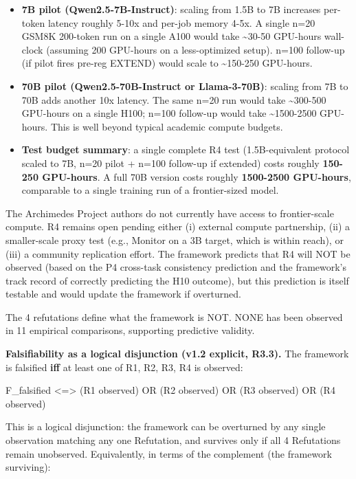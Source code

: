 \documentclass[11pt]{article}
\begin{document}
\begin{itemize}
\item
  \textbf{7B pilot (Qwen2.5-7B-Instruct)}: scaling from 1.5B to 7B
  increases per-token latency roughly 5-10x and per-job memory 4-5x. A
  single n=20 GSM8K 200-token run on a single A100 would take
  \textasciitilde30-50 GPU-hours wall-clock (assuming 200 GPU-hours on a
  less-optimized setup). n=100 follow-up (if pilot fires pre-reg EXTEND)
  would scale to \textasciitilde150-250 GPU-hours.
\item
  \textbf{70B pilot (Qwen2.5-70B-Instruct or Llama-3-70B)}: scaling from
  7B to 70B adds another 10x latency. The same n=20 run would take
  \textasciitilde300-500 GPU-hours on a single H100; n=100 follow-up
  would take \textasciitilde1500-2500 GPU-hours. This is well beyond
  typical academic compute budgets.
\item
  \textbf{Test budget summary}: a single complete R4 test
  (1.5B-equivalent protocol scaled to 7B, n=20 pilot + n=100 follow-up
  if extended) costs roughly \textbf{150-250 GPU-hours}. A full 70B
  version costs roughly \textbf{1500-2500 GPU-hours}, comparable to a
  single training run of a frontier-sized model.
\end{itemize}

The Archimedes Project authors do not currently have access to
frontier-scale compute. R4 remains open pending either (i) external
compute partnership, (ii) a smaller-scale proxy test (e.g., Monitor on a
3B target, which is within reach), or (iii) a community replication
effort. The framework predicts that R4 will NOT be observed (based on
the P4 cross-task consistency prediction and the framework's track
record of correctly predicting the H10 outcome), but this prediction is
itself testable and would update the framework if overturned.

The 4 refutations define what the framework is NOT. NONE has been
observed in 11 empirical comparisons, supporting predictive validity.

\textbf{Falsifiability as a logical disjunction (v1.2 explicit, R3.3).}
The framework is falsified \textbf{iff} at least one of R1, R2, R3, R4
is observed:

F\_falsified \textless=\textgreater{} (R1 observed) OR (R2 observed) OR
(R3 observed) OR (R4 observed)

This is a logical disjunction: the framework can be overturned by any
single observation matching any one Refutation, and survives only if all
4 Refutations remain unobserved. Equivalently, in terms of the
complement (the framework surviving):
\end{document}
